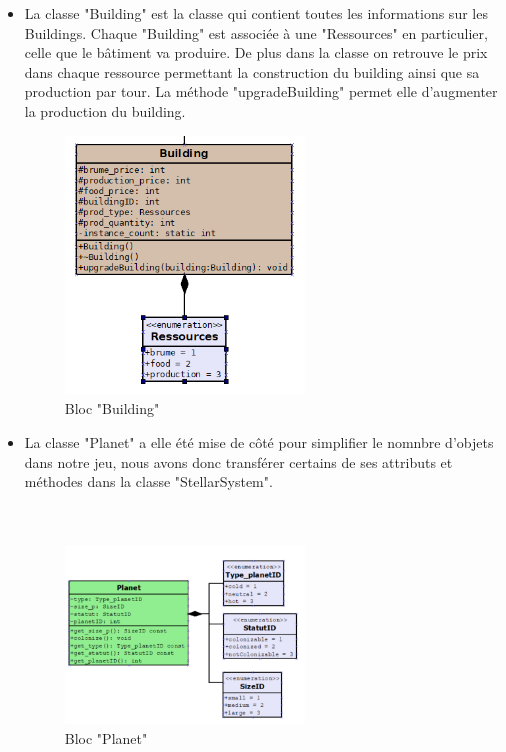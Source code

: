 \begin{itemize}
\item La classe "Building" est la classe qui contient toutes les informations sur les Buildings. Chaque "Building" est associée à une "Ressources" en particulier, celle que le bâtiment va produire. De plus dans la classe on retrouve le prix dans chaque ressource permettant la construction du building ainsi que sa production par tour. La méthode "upgradeBuilding" permet elle d'augmenter la production du building. \\

\begin{figure}[!h]
\centering
\includegraphics[width=0.6\textwidth]{pics/final_state/classe_batiment1.PNG}
\caption[Bloc "Building"]{\label{figure_simple}Bloc "Building"}
\end{figure}

\item La classe "Planet" a elle été mise de côté pour simplifier le nomnbre d'objets dans notre jeu,  nous avons donc transférer certains de ses attributs et méthodes dans la classe "StellarSystem". \\ \\ \\

\begin{figure}[!h]
\centering
\includegraphics[width=0.6\textwidth]{pics/classe_planet.PNG}
\caption[Bloc "Planet"]{\label{figure_simple}Bloc "Planet"}
\end{figure}


\end{itemize}
